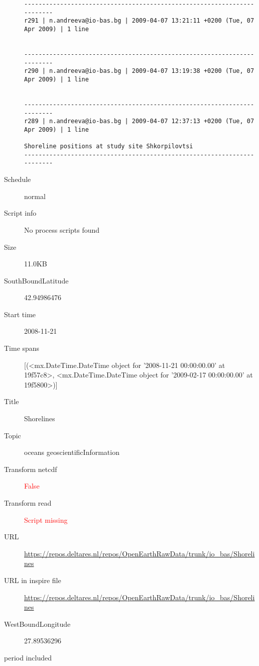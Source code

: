 \documentclass[9]{report}
\begin{document}
\begin{description}
\begin{verbatim}
------------------------------------------------------------------------
r291 | n.andreeva@io-bas.bg | 2009-04-07 13:21:11 +0200 (Tue, 07 Apr 2009) | 1 line


------------------------------------------------------------------------
r290 | n.andreeva@io-bas.bg | 2009-04-07 13:19:38 +0200 (Tue, 07 Apr 2009) | 1 line


------------------------------------------------------------------------
r289 | n.andreeva@io-bas.bg | 2009-04-07 12:37:13 +0200 (Tue, 07 Apr 2009) | 1 line

Shoreline positions at study site Shkorpilovtsi
------------------------------------------------------------------------

\end{verbatim}
  \item[Schedule] normal
  \item[Script info] No process scripts found
  \item[Size] 11.0KB
  \item[SouthBoundLatitude] 42.94986476
  \item[Start time] 2008-11-21
  \item[Time spans] [(<mx.DateTime.DateTime object for '2008-11-21 00:00:00.00' at 19f57c8>, <mx.DateTime.DateTime object for '2009-02-17 00:00:00.00' at 19f5800>)]
  \item[Title]  Shorelines 
  \item[Topic] oceans geoscientificInformation
  \item[Transform netcdf] \textcolor{red}{False}
  \item[Transform read] \textcolor{red}{Script missing}
  \item[URL] \href{https://repos.deltares.nl/repos/OpenEarthRawData/trunk/io\_bas/Shorelines}{https://repos.deltares.nl/repos/OpenEarthRawData/trunk/io\_bas/Shorelines}
  \item[URL in inspire file] \href{https://repos.deltares.nl/repos/OpenEarthRawData/trunk/io\_bas/Shorelines}{https://repos.deltares.nl/repos/OpenEarthRawData/trunk/io\_bas/Shorelines}
  \item[WestBoundLongitude] 27.89536296
  \item[period included] 
\end{description}
\end{document}
